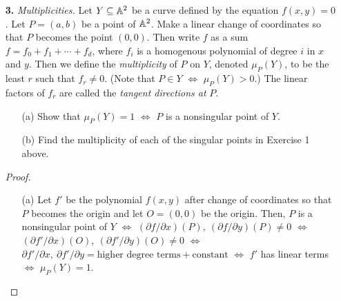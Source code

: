 \documentclass{article}
\begin{document}
\begin{enumerate} [label=\textbf{\arabic*.}, leftmargin=0cm]
\begin{proof} $ $ \vspace{0pt}
    \begin{center}
        \renewcommand{\arraystretch}{1.5}
        \begin{tabular}{c|c|c|c|c}
             $f$ & $\partial f / \partial x$ & $\partial f / \partial y$ & $\partial f / \partial z$ & $\text{Sing}~f$ \\ \hline
            $xy^2 - z^2$ & $y^2$ & $2xy$ & $-2z$ & $(t, 0, 0), ~ t \in k$ \\ \hline
            $x^2+y^2-z^2$ & $2x$ & $2y$ & $-2z$ & $(0, 0, 0)$ \\ \hline
            $x^3+y^3+xy$ & $3x^2 + y$ & $3y^2 + x$ & $0$ & $(0, 0, t), ~ t \in k$
        \end{tabular}
    \end{center}
    (a) is the pinch point, (b) is the conical double point, and (c) is the double line.
\end{proof}

\item[\textbf{3.}] \textit{Multiplicities.} Let $Y \subseteq \mathbb{A}^2$ be a curve defined by the equation $f(x, y) = 0$. Let $P = (a, b)$ be a point of $\mathbb{A}^2$. Make a linear change of coordinates so that $P$ becomes the point $(0, 0)$. Then write $f$ as a sum $f = f_0 + f_1 + \cdots + f_d$, where $f_i$ is a homogenous polynomial of degree $i$ in $x$ and $y$. Then we define the \textit{multiplicity} of $P$ on $Y$, denoted $\mu_P(Y)$, to be the least $r$ such that $f_r \neq 0$. (Note that $P \in Y$ $\iff$ $\mu_P(Y) > 0$.) The linear factors of $f_r$ are called the \textit{tangent directions at} $P$.
\begin{itemize}
    \item[(a)] Show that $\mu_P(Y) = 1$ $\iff$ $P$ is a nonsingular point of $Y$.
    \item[(b)] Find the multiplicity of each of the singular points in Exercise 1 above.
\end{itemize}

\begin{proof} $ $ \vspace{0pt}
    \begin{itemize} [leftmargin=0cm]
        \item[(a)] Let $f'$ be the polynomial $f(x, y)$ after change of coordinates so that $P$ becomes the origin and let $O = (0, 0)$ be the origin. Then, $P$ is a nonsingular point of $Y$ $\iff$ $(\partial f / \partial x)(P), ~ (\partial f / \partial y)(P) \neq 0$ $\iff$ $(\partial f' / \partial x)(O), ~ (\partial f' / \partial y)(O) \neq 0$ $\iff$ $\partial f' / \partial x, ~ \partial f' / \partial y = \text{higher degree terms} + \text{constant}$ $\iff$ $f'$ has linear terms $\iff$ $\mu_P(Y) = 1$.


\end{itemize}
\end{proof}
\end{enumerate}
\end{document}
